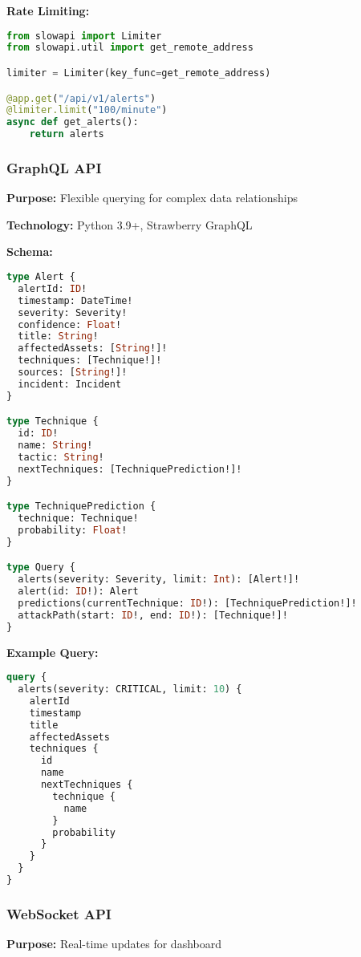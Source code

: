 \documentclass[12pt,a4paper]{article}
\begin{document}
\textbf{Rate Limiting:}
\begin{lstlisting}[language=python]
from slowapi import Limiter
from slowapi.util import get_remote_address

limiter = Limiter(key_func=get_remote_address)

@app.get("/api/v1/alerts")
@limiter.limit("100/minute")
async def get_alerts():
    return alerts
\end{lstlisting}

\subsubsection{GraphQL API}

\textbf{Purpose:} Flexible querying for complex data relationships

\textbf{Technology:} Python 3.9+, Strawberry GraphQL

\textbf{Schema:}
\begin{lstlisting}[language=graphql]
type Alert {
  alertId: ID!
  timestamp: DateTime!
  severity: Severity!
  confidence: Float!
  title: String!
  affectedAssets: [String!]!
  techniques: [Technique!]!
  sources: [String!]!
  incident: Incident
}

type Technique {
  id: ID!
  name: String!
  tactic: String!
  nextTechniques: [TechniquePrediction!]!
}

type TechniquePrediction {
  technique: Technique!
  probability: Float!
}

type Query {
  alerts(severity: Severity, limit: Int): [Alert!]!
  alert(id: ID!): Alert
  predictions(currentTechnique: ID!): [TechniquePrediction!]!
  attackPath(start: ID!, end: ID!): [Technique!]!
}
\end{lstlisting}

\textbf{Example Query:}
\begin{lstlisting}[language=graphql]
query {
  alerts(severity: CRITICAL, limit: 10) {
    alertId
    timestamp
    title
    affectedAssets
    techniques {
      id
      name
      nextTechniques {
        technique {
          name
        }
        probability
      }
    }
  }
}
\end{lstlisting}

\subsubsection{WebSocket API}

\textbf{Purpose:} Real-time updates for dashboard
\end{document}
